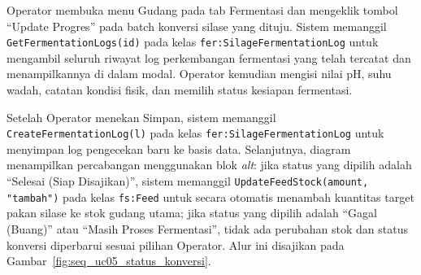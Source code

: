 Operator membuka menu Gudang pada tab Fermentasi dan mengeklik tombol
``Update Progres'' pada batch konversi silase yang dituju. Sistem
memanggil \texttt{GetFermentationLogs(id)} pada kelas
\texttt{fer:SilageFermentationLog} untuk mengambil seluruh riwayat log
perkembangan fermentasi yang telah tercatat dan menampilkannya di dalam
modal. Operator kemudian mengisi nilai pH, suhu wadah, catatan kondisi
fisik, dan memilih status kesiapan fermentasi.

Setelah Operator menekan Simpan, sistem memanggil
\texttt{CreateFermentationLog(l)} pada kelas
\texttt{fer:SilageFermentationLog} untuk menyimpan log pengecekan baru ke
basis data. Selanjutnya, diagram menampilkan percabangan menggunakan blok
\textit{alt}: jika status yang dipilih adalah ``Selesai (Siap Disajikan)'',
sistem memanggil \texttt{UpdateFeedStock(amount, "tambah")} pada kelas
\texttt{fs:Feed} untuk secara otomatis menambah kuantitas target pakan
silase ke stok gudang utama; jika status yang dipilih adalah ``Gagal
(Buang)'' atau ``Masih Proses Fermentasi'', tidak ada perubahan stok dan
status konversi diperbarui sesuai pilihan Operator. Alur ini disajikan
pada Gambar~\ref{fig:seq_uc05_status_konversi}.

